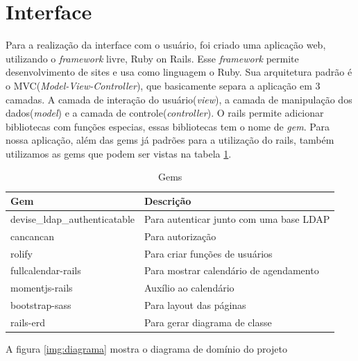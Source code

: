 \section{Interface} %
\label{sub:interface}
  Para a realização da interface com o usuário, foi criado uma aplicação web, utilizando o \textit{framework} livre, Ruby on Rails\cite{rails}.
Esse \textit{framework} permite desenvolvimento de sites e usa como linguagem o Ruby. Sua arquitetura padrão é o MVC(\textit{Model-View-Controller}),
 que basicamente separa a aplicação em 3 camadas. A camada de interação do usuário(\textit{view}), a camada de manipulação dos dados(\textit{model}) 
e a camada de controle(\textit{controller})\cite{mvc}.
  O rails permite adicionar bibliotecas com funções especias, essas bibliotecas tem o nome de \textit{gem}. Para nossa aplicação, além das gems já padrões para a utilização
  do rails, também utilizamos as gems que podem ser vistas na tabela \ref{gems}.
\begin{table}[H]
\centering
\caption{Gems}
\label{gems}
\begin{tabular}{|l|l|}
\hline
\rowcolor[HTML]{C0C0C0} 
{\color[HTML]{333333} \textbf{Gem}} & {\color[HTML]{333333} \textbf{Descrição}} \\ \hline
devise\_ldap\_authenticatable       & Para autenticar junto com uma base LDAP   \\ \hline
cancancan                           & Para autorização                          \\ \hline
rolify                              & Para criar funções de usuários            \\ \hline
fullcalendar-rails                  & Para mostrar calendário de agendamento    \\ \hline
momentjs-rails                      & Auxílio ao calendário                     \\ \hline
bootstrap-sass                      & Para layout das páginas                   \\ \hline
rails-erd                           & Para gerar diagrama de classe             \\ \hline
\end{tabular}
\end{table}

A figura \ref{img:diagrama} mostra o diagrama de domínio do projeto

